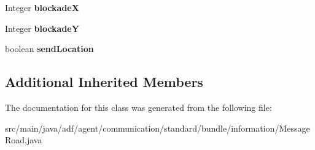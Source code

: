 \begin{DoxyCompactItemize}
Integer {\bfseries blockadeX}
\item 
\hypertarget{classadf_1_1agent_1_1communication_1_1standard_1_1bundle_1_1information_1_1MessageRoad_a8ceae6dcf313a74e5e0550b776c29338}{}\label{classadf_1_1agent_1_1communication_1_1standard_1_1bundle_1_1information_1_1MessageRoad_a8ceae6dcf313a74e5e0550b776c29338} 
Integer {\bfseries blockadeY}
\item 
\hypertarget{classadf_1_1agent_1_1communication_1_1standard_1_1bundle_1_1information_1_1MessageRoad_a85efc0c078f8fea9e0bc639d0d293d90}{}\label{classadf_1_1agent_1_1communication_1_1standard_1_1bundle_1_1information_1_1MessageRoad_a85efc0c078f8fea9e0bc639d0d293d90} 
boolean {\bfseries send\+Location}
\end{DoxyCompactItemize}
\subsection*{Additional Inherited Members}


The documentation for this class was generated from the following file\+:\begin{DoxyCompactItemize}
\item 
src/main/java/adf/agent/communication/standard/bundle/information/Message\+Road.\+java\end{DoxyCompactItemize}
